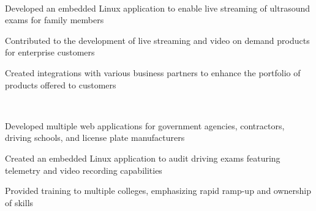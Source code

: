 \documentclass[a4paper]{my_cv}
\begin{document}
\begin{minipage}[t]{0.66\textwidth}
 \\
\vspace{\topsep} %
\begin{tightemize}
\item Developed an embedded Linux application to enable live streaming of ultrasound exams for family members
\item Contributed to the development of live streaming and video on demand products for enterprise customers
\item Created integrations with various business partners to enhance the portfolio of products offered to customers
\end{tightemize}
\sectionsep

 \\
\vspace{\topsep} %
\begin{tightemize}
\item Developed multiple web applications for government agencies, contractors, driving schools, and license plate manufacturers
\item Created an embedded Linux application to audit driving exams featuring telemetry and video recording capabilities
\item Provided training to multiple colleges, emphasizing rapid ramp-up and ownership of skills
\end{tightemize}
\sectionsep

 \\
\vspace{\topsep} %
\sectionsep

\end{minipage} 
\end{document}
